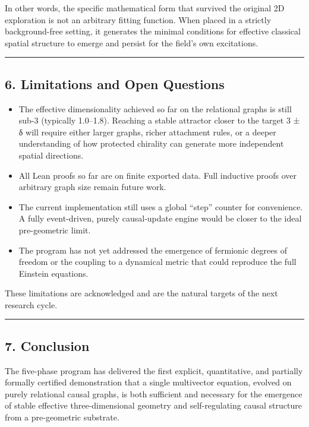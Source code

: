 \documentclass[
  11pt,
  a4paper,
]{article}
\providecommand{\tightlist}{%
  \setlength{\itemsep}{0pt}\setlength{\parskip}{0pt}}
\begin{document}
In other words, the specific mathematical form that survived the
original 2D exploration is not an arbitrary fitting function. When
placed in a strictly background-free setting, it generates the minimal
conditions for effective classical spatial structure to emerge and
persist for the field's own excitations.

\begin{center}\rule{0.5\linewidth}{0.5pt}\end{center}

\subsection{6. Limitations and Open
Questions}\label{limitations-and-open-questions}

\begin{itemize}
\tightlist
\item
  The effective dimensionality achieved so far on the relational graphs
  is still sub-3 (typically 1.0--1.8). Reaching a stable attractor
  closer to the target 3 ± δ will require either larger graphs, richer
  attachment rules, or a deeper understanding of how protected chirality
  can generate more independent spatial directions.
\item
  All Lean proofs so far are on finite exported data. Full inductive
  proofs over arbitrary graph size remain future work.
\item
  The current implementation still uses a global ``step'' counter for
  convenience. A fully event-driven, purely causal-update engine would
  be closer to the ideal pre-geometric limit.
\item
  The program has not yet addressed the emergence of fermionic degrees
  of freedom or the coupling to a dynamical metric that could reproduce
  the full Einstein equations.
\end{itemize}

These limitations are acknowledged and are the natural targets of the
next research cycle.

\begin{center}\rule{0.5\linewidth}{0.5pt}\end{center}

\subsection{7. Conclusion}\label{conclusion}

The five-phase program has delivered the first explicit, quantitative,
and partially formally certified demonstration that a single multivector
equation, evolved on purely relational causal graphs, is both sufficient
and necessary for the emergence of stable effective three-dimensional
geometry and self-regulating causal structure from a pre-geometric
substrate.
\end{document}

